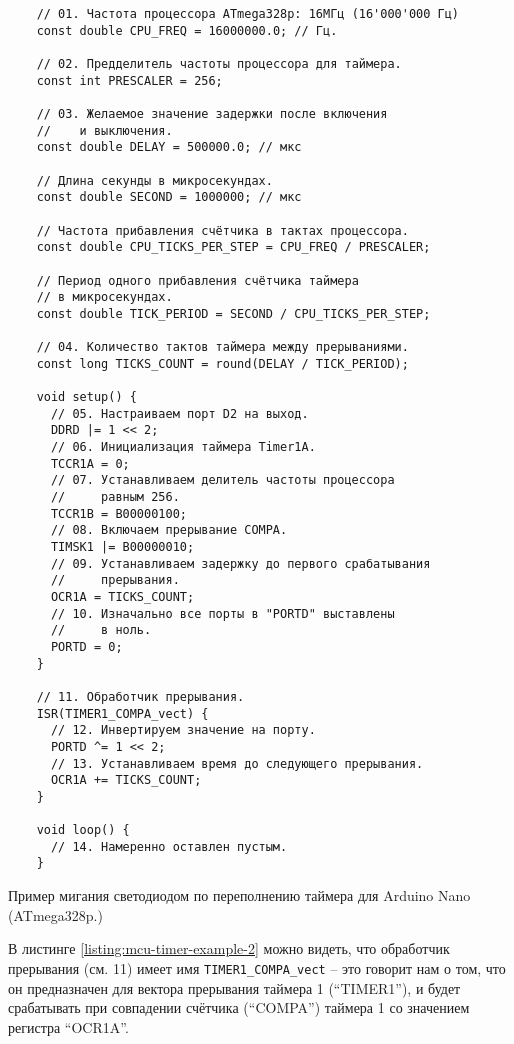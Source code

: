 \documentclass[../sparc.tex]{subfiles}
\begin{document}
\begin{listing}[H]
  \begin{verbatim}
    // 01. Частота процессора ATmega328p: 16МГц (16'000'000 Гц)
    const double CPU_FREQ = 16000000.0; // Гц.

    // 02. Предделитель частоты процессора для таймера.
    const int PRESCALER = 256;

    // 03. Желаемое значение задержки после включения
    //    и выключения.
    const double DELAY = 500000.0; // мкс

    // Длина секунды в микросекундах.
    const double SECOND = 1000000; // мкс

    // Частота прибавления счётчика в тактах процессора.
    const double CPU_TICKS_PER_STEP = CPU_FREQ / PRESCALER;

    // Период одного прибавления счётчика таймера
    // в микросекундах.
    const double TICK_PERIOD = SECOND / CPU_TICKS_PER_STEP;

    // 04. Количество тактов таймера между прерываниями.
    const long TICKS_COUNT = round(DELAY / TICK_PERIOD);

    void setup() {
      // 05. Настраиваем порт D2 на выход.
      DDRD |= 1 << 2;
      // 06. Инициализация таймера Timer1A.
      TCCR1A = 0;
      // 07. Устанавливаем делитель частоты процессора
      //     равным 256.
      TCCR1B = B00000100;
      // 08. Включаем прерывание COMPA.
      TIMSK1 |= B00000010;
      // 09. Устанавливаем задержку до первого срабатывания
      //     прерывания.
      OCR1A = TICKS_COUNT;
      // 10. Изначально все порты в "PORTD" выставлены
      //     в ноль.
      PORTD = 0;
    }

    // 11. Обработчик прерывания.
    ISR(TIMER1_COMPA_vect) {
      // 12. Инвертируем значение на порту.
      PORTD ^= 1 << 2;
      // 13. Устанавливаем время до следующего прерывания.
      OCR1A += TICKS_COUNT;
    }

    void loop() {
      // 14. Намеренно оставлен пустым.
    }
  \end{verbatim}
  \caption{Пример мигания светодиодом по переполнению таймера для Arduino Nano
    (ATmega328p.)}
  \label{listing:mcu-timer-example-2}
\end{listing}

В листинге \ref{listing:mcu-timer-example-2} можно видеть, что обработчик
прерывания (см. 11) имеет имя \texttt{TIMER1_COMPA_vect} -- это говорит
нам о том, что он предназначен для вектора прерывания таймера 1 (``TIMER1''), и
будет срабатывать при совпадении счётчика (``COMPA'') таймера 1 со значением
регистра ``OCR1A''.
\end{document}
